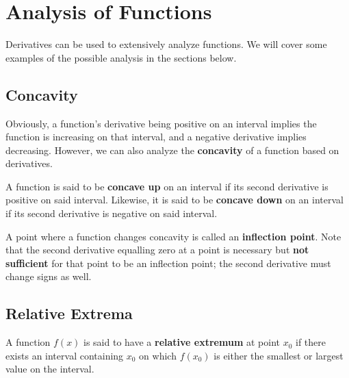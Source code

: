 \documentclass[11pt]{article}
\begin{document}
\begin{center}
\end{center}


\section{Analysis of Functions}
Derivatives can be used to extensively analyze functions. We will cover some examples of the possible analysis in the sections below.

\subsection{Concavity}
Obviously, a function's derivative being positive on an interval implies the function is increasing on that interval, and a negative derivative implies decreasing. However, we can also analyze the \textbf{concavity} of a function based on derivatives. 

A function is said to be \textbf{concave up} on an interval if its second derivative is positive on said interval. Likewise, it is said to be \textbf{concave down} on an interval if its second derivative is negative on said interval.

A point where a function changes concavity is called an \textbf{inflection point}. Note that the second derivative equalling zero at a point is necessary but \textbf{not sufficient} for that point to be an inflection point; the second derivative must change signs as well. 

\subsection{Relative Extrema}
A function $f(x)$ is said to have a \textbf{relative extremum} at point $x_0$ if there exists an interval containing $x_0$ on which $f(x_0)$ is either the smallest or largest value on the interval.
\end{document}
